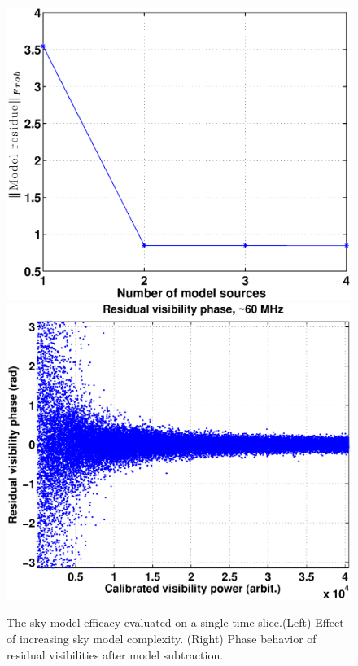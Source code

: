 \documentclass{aa}
\begin{document}
\begin{figure}[tbh]
\subfloat
  {\includegraphics[width=1\columnwidth]{Figs/model_efficacy.eps}}
\subfloat
  {\includegraphics[width=1\columnwidth]{Figs/selfcal_ph_behaviour_new.eps}}

\caption{\label{fig:The-model-amplitude}The  sky model  efficacy evaluated  on a
  single  time slice.(Left) Effect  of increasing  sky model  complexity. (Right)
  Phase behavior of residual visibilities after model subtraction.}
\end{figure}
\end{document}

